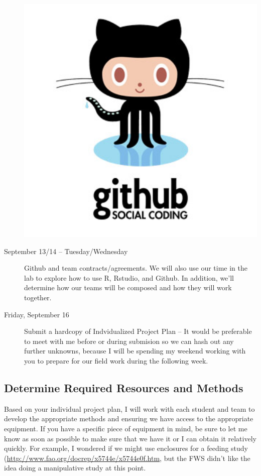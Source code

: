 \documentclass{tufte-handout}\usepackage[]{graphicx}\usepackage[]{color}
\begin{document}
\begin{description}
\begin{marginfigure}
   \includegraphics[width=1.0\textwidth]{github_logo.jpg}
\end{marginfigure}

\item[September 13/14 -- Tuesday/Wednesday] Github and team contracts/agreements. We will also use our time in the lab to explore how to use R, Rstudio, and Github. In addition, we'll determine how our teams will be composed and how they will work together.

\item[Friday, September 16] Submit a hardcopy of Indvidualized Project Plan -- It would be preferable to meet with me before or during submision so we can hash out any further unknowns, because I will be spending my weekend working with you to prepare for our field work during the following week.

\end{description}

\subsection{Determine Required Resources and Methods}

Based on your individual project plan, I will work with each student and team to develop the appropriate methods and ensuring we have access to the appropriate equipment. If you have a specific piece of equipment in mind, be sure to let me know as soon as possible to make sure that we have it or I can obtain it relatively quickly. For example, I wondered if we might use enclosures for a feeding study (\href{http://www.fao.org/docrep/x5744e/x5744e0f.htm}{http://www.fao.org/docrep/x5744e/x5744e0f.htm}, but the FWS didn't like the idea doing a manipulative study at this point.
\end{document}
